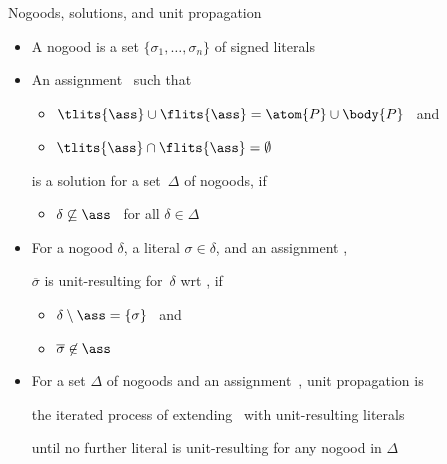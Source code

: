 \begin{frame}{Nogoods, solutions, and unit propagation}
  \bigskip
  \begin{itemize}
  \item A \alert{nogood} is a set $\{\sigma_1,\ldots,\sigma_n\}$ of signed literals
  \item An assignment \ass\ such that
    \par\smallskip
    \begin{itemize}\normalsize
    \item \( \tlits{\ass} \cup \flits{\ass} = \atom{P}\cup\body{P} \) \ and
      \smallskip
    \item \( \tlits{\ass} \cap \flits{\ass} = \emptyset \)
    \end{itemize}
    \par\smallskip
    is a \alert{solution} for a set~$\Delta$ of nogoods,
    if
    \par\smallskip
    \begin{itemize}\normalsize
    \item $\delta\not\subseteq\ass$ \ for all $\delta\in\Delta$
    \end{itemize}
    \bigskip
  \item For a nogood $\delta$, a literal $\sigma\in\delta$, and an assignment \ass,
    \par\smallskip
    \alert{$\overline{\sigma}$} is \alert{unit-resulting} for~$\delta$ wrt \ass,
    if
    \par\smallskip
    \begin{itemize}\normalsize
    \item $\delta\setminus\ass=\{\sigma\}$
      \ and
    \par\smallskip
    \item $\overline{\sigma}\not\in\ass$
    \end{itemize}
    \smallskip
  \item For a set $\Delta$ of nogoods and an assignment~\ass,
    \alert{unit propagation} is

    the iterated process of extending \ass\ with unit-resulting literals

    until no further literal is unit-resulting for any nogood in $\Delta$
  \end{itemize}
\end{frame}
%
